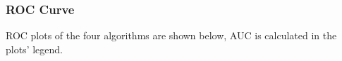 \documentclass[12pt]{article}
\begin{document}
\subsubsection{ROC Curve}
ROC plots of the four algorithms are shown below, AUC is calculated in the plots' legend.
\begin{figure}[H]
\captionsetup[subfigure]{labelformat=empty}
\centering
{}
\end{figure}
\vspace*{-1.5cm}
\end{document}
